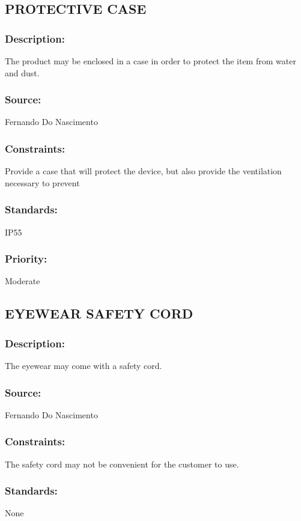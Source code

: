 \subsection{\text PROTECTIVE CASE }
\subsubsection{Description:} 
	{The product may be enclosed in a case in order to protect the item from water and dust.}
\subsubsection{Source:} 
	{Fernando Do Nascimento}
\subsubsection{Constraints:} 
	{Provide a case that will protect the device, but also provide the ventilation necessary to prevent}
\subsubsection{Standards:}
	{ IP55}
\subsubsection{Priority:}
	{ Moderate}
\newline
\newline

\subsection{\text EYEWEAR SAFETY CORD}
\subsubsection{Description:} 
	{The eyewear may come with a safety cord.}
\subsubsection{Source:} 
	{Fernando Do Nascimento}
\subsubsection{Constraints:}
	{The safety cord may not be convenient for the customer to use.}
\subsubsection{Standards:} 
	{None}
